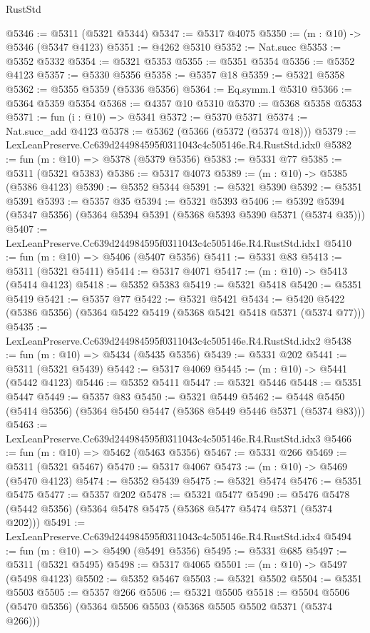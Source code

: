 \begin{lexlean}{RustStd}
\begin{coremodule}
@5346 := @5311 (@5321 @5344)
@5347 := @5317 @4075
@5350 := (m : @10) -> @5346 (@5347 @4123)
@5351 := @4262 @5310
@5352 := Nat.succ
@5353 := @5352 @5332
@5354 := @5321 @5353
@5355 := @5351 @5354
@5356 := @5352 @4123
@5357 := @5330 @5356
@5358 := @5357 @18
@5359 := @5321 @5358
@5362 := @5355 @5359 (@5336 @5356)
@5364 := Eq.symm.{1} @5310
@5366 := @5364 @5359 @5354
@5368 := @4357 @10 @5310
@5370 := @5368 @5358 @5353
@5371 := fun (i : @10) => @5341
@5372 := @5370 @5371
@5374 := Nat.succ_add @4123
@5378 := @5362 (@5366 (@5372 (@5374 @18)))
@5379 := LexLeanPreserve.Cc639d244984595f0311043c4c505146e.R4.RustStd.idx0
@5382 := fun (m : @10) => @5378 (@5379 @5356)
@5383 := @5331 @77
@5385 := @5311 (@5321 @5383)
@5386 := @5317 @4073
@5389 := (m : @10) -> @5385 (@5386 @4123)
@5390 := @5352 @5344
@5391 := @5321 @5390
@5392 := @5351 @5391
@5393 := @5357 @35
@5394 := @5321 @5393
@5406 := @5392 @5394 (@5347 @5356) (@5364 @5394 @5391 (@5368 @5393 @5390 @5371 (@5374 @35)))
@5407 := LexLeanPreserve.Cc639d244984595f0311043c4c505146e.R4.RustStd.idx1
@5410 := fun (m : @10) => @5406 (@5407 @5356)
@5411 := @5331 @83
@5413 := @5311 (@5321 @5411)
@5414 := @5317 @4071
@5417 := (m : @10) -> @5413 (@5414 @4123)
@5418 := @5352 @5383
@5419 := @5321 @5418
@5420 := @5351 @5419
@5421 := @5357 @77
@5422 := @5321 @5421
@5434 := @5420 @5422 (@5386 @5356) (@5364 @5422 @5419 (@5368 @5421 @5418 @5371 (@5374 @77)))
@5435 := LexLeanPreserve.Cc639d244984595f0311043c4c505146e.R4.RustStd.idx2
@5438 := fun (m : @10) => @5434 (@5435 @5356)
@5439 := @5331 @202
@5441 := @5311 (@5321 @5439)
@5442 := @5317 @4069
@5445 := (m : @10) -> @5441 (@5442 @4123)
@5446 := @5352 @5411
@5447 := @5321 @5446
@5448 := @5351 @5447
@5449 := @5357 @83
@5450 := @5321 @5449
@5462 := @5448 @5450 (@5414 @5356) (@5364 @5450 @5447 (@5368 @5449 @5446 @5371 (@5374 @83)))
@5463 := LexLeanPreserve.Cc639d244984595f0311043c4c505146e.R4.RustStd.idx3
@5466 := fun (m : @10) => @5462 (@5463 @5356)
@5467 := @5331 @266
@5469 := @5311 (@5321 @5467)
@5470 := @5317 @4067
@5473 := (m : @10) -> @5469 (@5470 @4123)
@5474 := @5352 @5439
@5475 := @5321 @5474
@5476 := @5351 @5475
@5477 := @5357 @202
@5478 := @5321 @5477
@5490 := @5476 @5478 (@5442 @5356) (@5364 @5478 @5475 (@5368 @5477 @5474 @5371 (@5374 @202)))
@5491 := LexLeanPreserve.Cc639d244984595f0311043c4c505146e.R4.RustStd.idx4
@5494 := fun (m : @10) => @5490 (@5491 @5356)
@5495 := @5331 @685
@5497 := @5311 (@5321 @5495)
@5498 := @5317 @4065
@5501 := (m : @10) -> @5497 (@5498 @4123)
@5502 := @5352 @5467
@5503 := @5321 @5502
@5504 := @5351 @5503
@5505 := @5357 @266
@5506 := @5321 @5505
@5518 := @5504 @5506 (@5470 @5356) (@5364 @5506 @5503 (@5368 @5505 @5502 @5371 (@5374 @266)))

\end{coremodule}
\end{lexlean}
